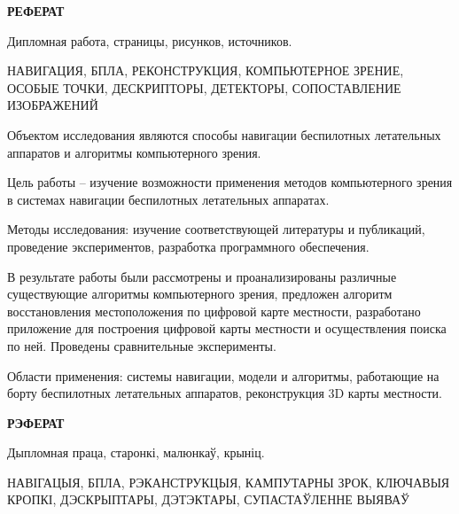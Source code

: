 \begin{center}
  \large\bfseries{РЕФЕРАТ}
\end{center}

Дипломная работа, \pages страницы, \figures рисунков, \sources источников.

\begin{justify}
    \large{НАВИГАЦИЯ, БПЛА, РЕКОНСТРУКЦИЯ, КОМПЬЮТЕРНОЕ ЗРЕНИЕ, ОСОБЫЕ ТОЧКИ, ДЕСКРИПТОРЫ, ДЕТЕКТОРЫ, СОПОСТАВЛЕНИЕ ИЗОБРАЖЕНИЙ}
\end{justify}

Объектом исследования являются способы навигации беспилотных летательных аппаратов и алгоритмы компьютерного зрения.

\vspace{1em}

Цель работы -- изучение возможности применения методов компьютерного зрения в системах навигации беспилотных летательных аппаратах.

\vspace{1em}

Методы исследования: изучение соответствующей литературы и публикаций, проведение экспериментов, разработка программного обеспечения.

\vspace{1em}

В результате работы были рассмотрены и проанализированы различные существующие алгоритмы компьютерного зрения, предложен алгоритм восстановления местоположения по цифровой карте местности, разработано приложение для построения цифровой карты местности и осуществления поиска по ней. Проведены сравнительные эксперименты.

\vspace{1em}

Области применения: системы навигации, модели и алгоритмы, работающие на борту беспилотных летательных аппаратов, реконструкция 3D карты местности.
\newpage



\begin{center}
     \large\bfseries{РЭФЕРАТ}
\end{center}

Дыпломная праца, \pages старонкі, \figures малюнкаў, \sources крыніц.

\begin{justify}
  \large{НАВІГАЦЫЯ, БПЛА, РЭКАНСТРУКЦЫЯ, КАМПУТАРНЫ ЗРОК, КЛЮЧАВЫЯ КРОПКІ, ДЭСКРЫПТАРЫ, ДЭТЭКТАРЫ, СУПАСТАЎЛЕННЕ ВЫЯВАЎ}
\end{justify}

